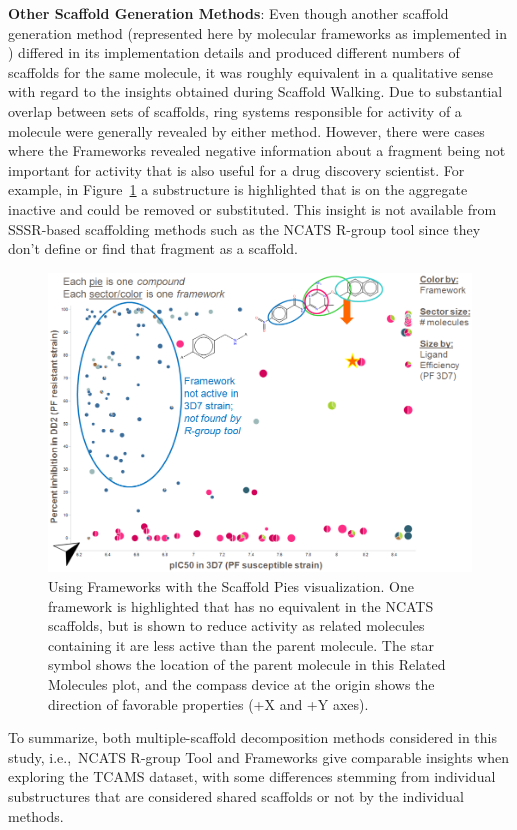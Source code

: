 \documentclass[11pt,letterpaper]{article}
\newcommand*\fref[1]{Figure~\ref{fig:#1}}
\newcommand*\sref[1]{Section~\ref{sec:#1}}
\newcommand*\ie{i.e.,~}
\begin{document}
{\bf Other Scaffold Generation Methods}: Even though another scaffold generation method (represented here by molecular frameworks as implemented in \cite{Harper2004DDclus}) differed in its implementation details and produced different numbers of scaffolds for the same molecule, it was roughly equivalent in a qualitative sense with regard to the insights obtained during Scaffold Walking. Due to substantial overlap between sets of scaffolds, ring systems responsible for activity of a molecule were generally revealed by either method. However, there were cases where the Frameworks revealed negative information about a fragment being not important for activity that is also useful for a drug discovery scientist. For example, in \fref{frameswalk} a substructure is highlighted that is on the aggregate inactive and could be removed or substituted. This insight is not available from SSSR-based scaffolding methods such as the NCATS R-group tool since they don't define or find that fragment as a scaffold.

\begin{figure}
\includegraphics[width=5in]{../fig/mol1_frames_scafpie.png}
\caption{Using Frameworks with the Scaffold Pies visualization. One framework is highlighted that has no equivalent in the NCATS scaffolds, but is shown to reduce activity as related molecules containing it are less active than the parent molecule.   The star symbol shows the location of the parent molecule in this Related Molecules plot, and the compass device at the origin shows the direction of favorable properties (+X and +Y axes).}      
\label{fig:frameswalk}
\end{figure}


To summarize, both multiple-scaffold decomposition methods considered in this study, \ie NCATS R-group Tool and Frameworks give comparable insights when exploring the TCAMS dataset, with some differences stemming from individual substructures that are considered shared scaffolds or not by the individual methods.
\end{document}
